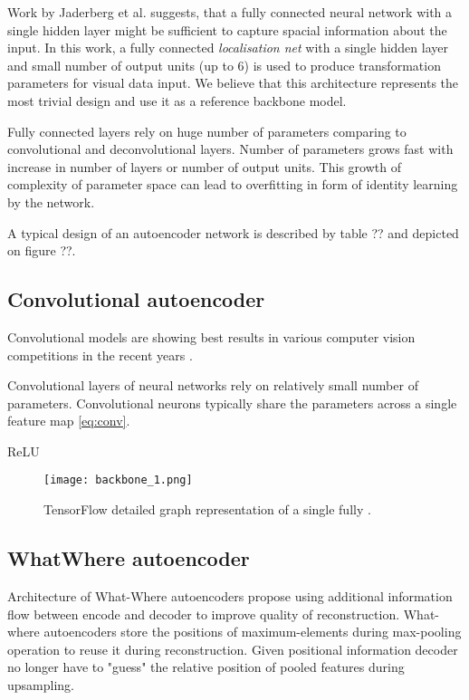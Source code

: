 Work by Jaderberg et al. \cite{Jaderberg2015} suggests, that a fully connected neural network with a single hidden layer might be sufficient to capture spacial information about the input.
In this work, a fully connected \textit{localisation net} with a single hidden layer and small number of output units (up to 6) is used to produce transformation parameters for visual data input.
We believe that this architecture represents the most trivial design and use it as a reference backbone model.

Fully connected layers rely on huge number of parameters comparing to convolutional and deconvolutional layers.
Number of parameters grows fast with increase in number of layers or number of output units.
This growth of complexity of parameter space can lead to overfitting in form of identity learning by the network.

A typical design of an autoencoder network is described by table ?? and depicted on figure ??.

\subsection{Convolutional autoencoder}

Convolutional models are showing best results in various computer vision competitions in the recent years \cite{ILSVRC15, Zhou2016}.

Convolutional layers of neural networks rely on relatively small number of parameters.
Convolutional neurons typically share the parameters across a single feature map \ref{eq:conv}.

ReLU \cite{Nair2010}

\begin{figure}[h!]
  \centering
    \texttt{[image: backbone\_1.png]}
  \caption{TensorFlow detailed graph representation of a single fully .}
  \label{fig:tf_graph}
\end{figure}

\subsection{WhatWhere autoencoder}

Architecture of What-Where autoencoders \cite{Zhao2015} propose using additional information flow between encode and decoder to improve quality of reconstruction.
What-where autoencoders store the positions of maximum-elements during max-pooling operation to reuse it during reconstruction.
Given positional information decoder no longer have to "guess" the relative position of pooled features during upsampling.


